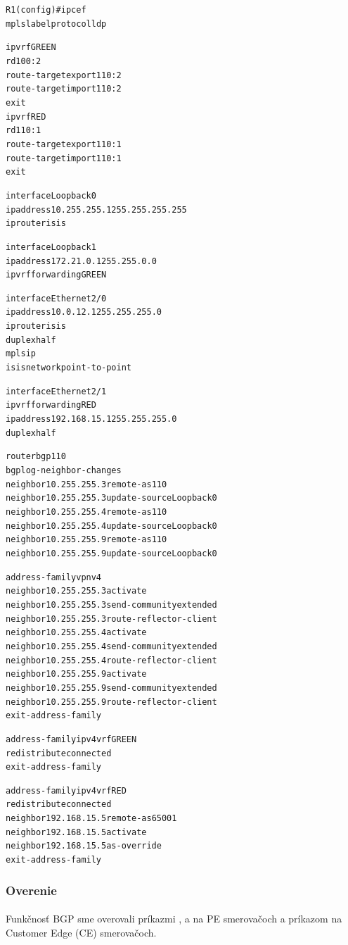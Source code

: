 \documentclass[12pt,twoside,a4paper]{report}
\begin{document}
\noindent
{\selectfont
\begin{small}
\begin{alltt}
R1(config)#ip cef
mpls label protocol ldp

ip vrf GREEN
 rd 100:2 
 route-target export 110:2
 route-target import 110:2
 exit
ip vrf RED
 rd 110:1
 route-target export 110:1
 route-target import 110:1
 exit

interface Loopback0
 ip address 10.255.255.1 255.255.255.255
 ip router isis

interface Loopback1
 ip address 172.21.0.1 255.255.0.0
 ip vrf forwarding GREEN

interface Ethernet2/0
 ip address 10.0.12.1 255.255.255.0
 ip router isis 
 duplex half
 mpls ip
 isis network point-to-point 

interface Ethernet2/1
 ip vrf forwarding RED
 ip address 192.168.15.1 255.255.255.0
 duplex half

router bgp 110
 bgp log-neighbor-changes
 neighbor 10.255.255.3 remote-as 110
 neighbor 10.255.255.3 update-source Loopback0
 neighbor 10.255.255.4 remote-as 110
 neighbor 10.255.255.4 update-source Loopback0
 neighbor 10.255.255.9 remote-as 110
 neighbor 10.255.255.9 update-source Loopback0

 address-family vpnv4
  neighbor 10.255.255.3 activate
  neighbor 10.255.255.3 send-community extended
  neighbor 10.255.255.3 route-reflector-client
  neighbor 10.255.255.4 activate
  neighbor 10.255.255.4 send-community extended
  neighbor 10.255.255.4 route-reflector-client
  neighbor 10.255.255.9 activate
  neighbor 10.255.255.9 send-community extended
  neighbor 10.255.255.9 route-reflector-client
 exit-address-family
 
 address-family ipv4 vrf GREEN
  redistribute connected
 exit-address-family
 
 address-family ipv4 vrf RED
  redistribute connected
  neighbor 192.168.15.5 remote-as 65001
  neighbor 192.168.15.5 activate
  neighbor 192.168.15.5 as-override
 exit-address-family
\end{alltt}
\end{small}
}


\subsubsection{Overenie}
\paragraph{}
Funkčnosť BGP sme overovali príkazmi ,  a  na PE smerovačoch a príkazom  na Customer Edge (CE) smerovačoch.
\end{document}
